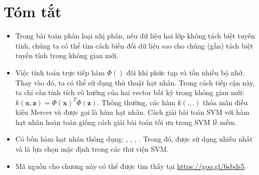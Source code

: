 \section{Tóm tắt }

\begin{itemize}
    \item Trong bài toán phân loại nhị phân, nếu dữ liệu hai lớp {không tách biệt tuyến tính}, chúng ta có thể tìm cách biến đổi dữ liệu sao cho chúng (gần) tách biệt tuyến tính trong không gian mới. 
     
    \item Việc tính toán trực tiếp hàm $\Phi()$ đôi khi phức tạp và tốn nhiều bộ nhớ. Thay vào đó, ta có thể sử dụng thủ thuật hạt nhân. Trong cách tiếp cận này, ta chỉ cần tính tích vô hướng của hai vector bất kỳ trong không gian mới: $k(\mathbf{x}, \mathbf{z}) = \Phi(\mathbf{x})^T\Phi(\mathbf{z})$. 
    Thông thường, các hàm $k(., .)$ thỏa mãn điều kiện Mercer và được
    gọi là hàm hạt nhân. Cách giải bài toán SVM với hàm hạt nhân hoàn toàn giống cách giải bài toán tối ưu trong SVM lề mềm. 
     
    \item Có bốn hàm hạt nhân thông dụng: ,
    , , . Trong đó,  được sử dụng nhiều nhất và là lựa chọn mặc định trong các thư viện SVM.
     
    \item Mã nguồn cho chương này có thể được tìm thấy tại \url{https://goo.gl/6sbds5}.
     
\end{itemize}
 
 
 
 
 
 
